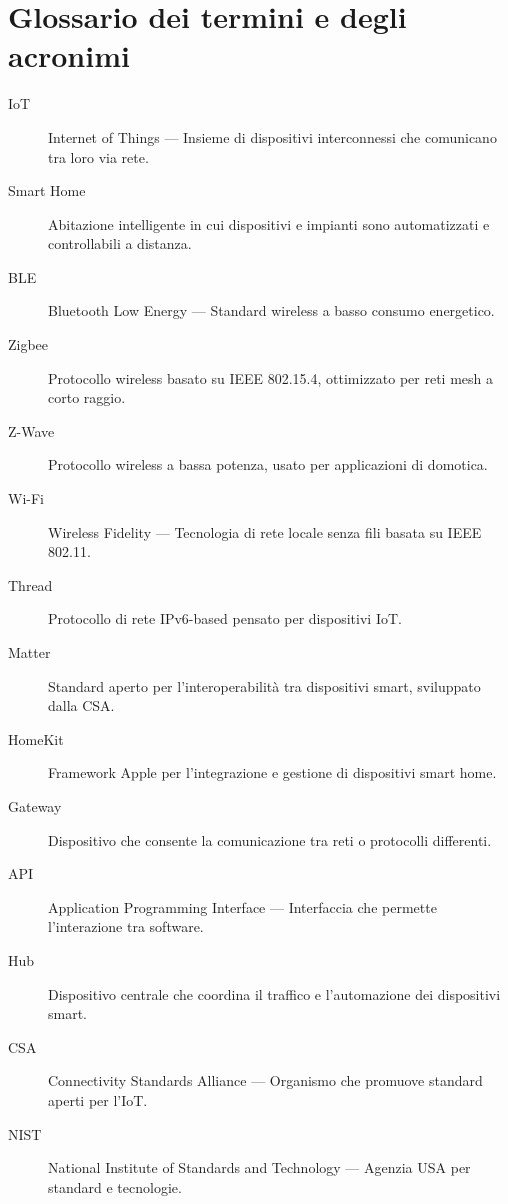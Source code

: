 \chapter{Glossario dei termini e degli acronimi}
\begin{description}
    \item[IoT] Internet of Things --- Insieme di dispositivi interconnessi che comunicano tra loro via rete.
    \item[Smart Home] Abitazione intelligente in cui dispositivi e impianti sono automatizzati e controllabili a distanza.
    \item[BLE] Bluetooth Low Energy --- Standard wireless a basso consumo energetico.
    \item[Zigbee] Protocollo wireless basato su IEEE 802.15.4, ottimizzato per reti mesh a corto raggio.
    \item[Z-Wave] Protocollo wireless a bassa potenza, usato per applicazioni di domotica.
    \item[Wi-Fi] Wireless Fidelity --- Tecnologia di rete locale senza fili basata su IEEE 802.11.
    \item[Thread] Protocollo di rete IPv6-based pensato per dispositivi IoT.
    \item[Matter] Standard aperto per l'interoperabilità tra dispositivi smart, sviluppato dalla CSA.
    \item[HomeKit] Framework Apple per l'integrazione e gestione di dispositivi smart home.
    \item[Gateway] Dispositivo che consente la comunicazione tra reti o protocolli differenti.
    \item[API] Application Programming Interface --- Interfaccia che permette l'interazione tra software.
    \item[Hub] Dispositivo centrale che coordina il traffico e l'automazione dei dispositivi smart.
    \item[CSA] Connectivity Standards Alliance --- Organismo che promuove standard aperti per l'IoT.
    \item[NIST] National Institute of Standards and Technology --- Agenzia USA per standard e tecnologie.
\end{description}